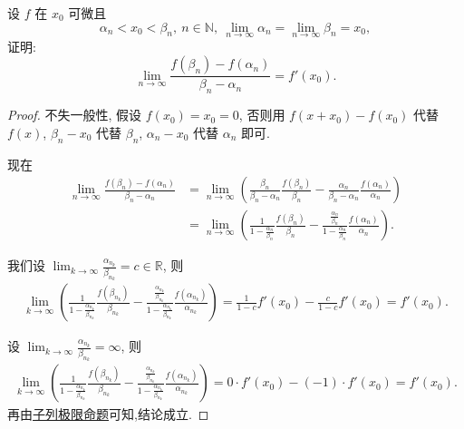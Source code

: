 \documentclass[../../main.tex]{subfiles}%
\begin{document}
\begin{example}
设 $f$ 在 $x_0$ 可微且
$$
\alpha_n < x_0 < \beta_n,\ n\in\mathbb{N},\ \lim_{n\to\infty}\alpha_n = \lim_{n\to\infty}\beta_n = x_0,
$$
证明:
$$
\lim_{n\to\infty}\frac{f(\beta_n)-f(\alpha_n)}{\beta_n-\alpha_n}=f'(x_0).
$$
\end{example}
\begin{proof}
不失一般性, 假设 $f(x_0)=x_0=0$, 否则用 $f(x+x_0)-f(x_0)$ 代替 $f(x)$, $\beta_n-x_0$ 代替 $\beta_n$, $\alpha_n-x_0$ 代替 $\alpha_n$ 即可.

现在
\begin{align*}
\lim_{n\to\infty}\frac{f(\beta_n)-f(\alpha_n)}{\beta_n-\alpha_n}
&= \lim_{n\to\infty}\left(\frac{\beta_n}{\beta_n-\alpha_n}\frac{f(\beta_n)}{\beta_n}-\frac{\alpha_n}{\beta_n-\alpha_n}\frac{f(\alpha_n)}{\alpha_n}\right) \\
&= \lim_{n\to\infty}\left(\frac{1}{1-\frac{\alpha_n}{\beta_n}}\frac{f(\beta_n)}{\beta_n}-\frac{\frac{\alpha_n}{\beta_n}}{1-\frac{\alpha_n}{\beta_n}}\frac{f(\alpha_n)}{\alpha_n}\right).
\end{align*}

我们设 $\lim_{k\to\infty}\frac{\alpha_{n_k}}{\beta_{n_k}}=c\in\mathbb{R}$, 则
\begin{align*}
\lim_{k\to\infty}\left(\frac{1}{1-\frac{\alpha_{n_k}}{\beta_{n_k}}}\frac{f(\beta_{n_k})}{\beta_{n_k}}-\frac{\frac{\alpha_{n_k}}{\beta_{n_k}}}{1-\frac{\alpha_{n_k}}{\beta_{n_k}}}\frac{f(\alpha_{n_k})}{\alpha_{n_k}}\right)
= \frac{1}{1-c}f'(x_0)-\frac{c}{1-c}f'(x_0)=f'(x_0).
\end{align*}

设 $\lim_{k\to\infty}\frac{\alpha_{n_k}}{\beta_{n_k}}=\infty$, 则
\begin{align*}
\lim_{k\to\infty}\left(\frac{1}{1-\frac{\alpha_{n_k}}{\beta_{n_k}}}\frac{f(\beta_{n_k})}{\beta_{n_k}}-\frac{\frac{\alpha_{n_k}}{\beta_{n_k}}}{1-\frac{\alpha_{n_k}}{\beta_{n_k}}}\frac{f(\alpha_{n_k})}{\alpha_{n_k}}\right)
= 0\cdot f'(x_0)-(-1)\cdot f'(x_0)=f'(x_0).
\end{align*}
再由\hyperref[proposition:子列极限命题]{子列极限命题}可知,结论成立.
\end{proof}
\end{document}
